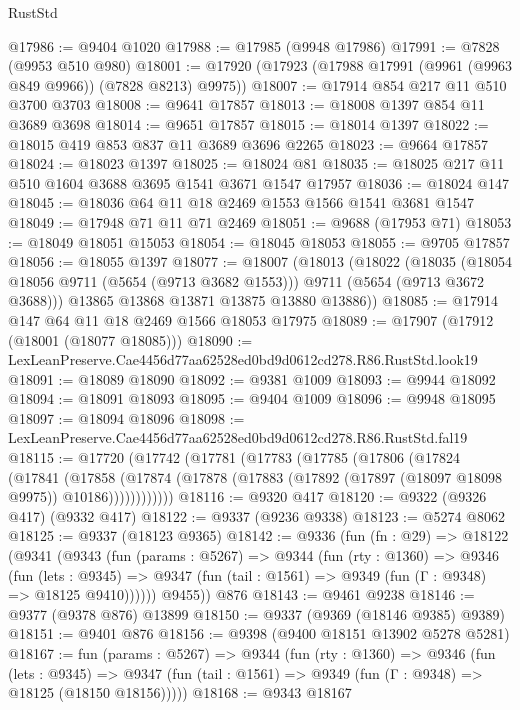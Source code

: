 \begin{lexlean}{RustStd}
\begin{coremodule}
@17986 := @9404 @1020
@17988 := @17985 (@9948 @17986)
@17991 := @7828 (@9953 @510 @980)
@18001 := @17920 (@17923 (@17988 @17991 (@9961 (@9963 @849 @9966)) (@7828 @8213) @9975))
@18007 := @17914 @854 @217 @11 @510 @3700 @3703
@18008 := @9641 @17857
@18013 := @18008 @1397 @854 @11 @3689 @3698
@18014 := @9651 @17857
@18015 := @18014 @1397
@18022 := @18015 @419 @853 @837 @11 @3689 @3696 @2265
@18023 := @9664 @17857
@18024 := @18023 @1397
@18025 := @18024 @81
@18035 := @18025 @217 @11 @510 @1604 @3688 @3695 @1541 @3671 @1547 @17957
@18036 := @18024 @147
@18045 := @18036 @64 @11 @18 @2469 @1553 @1566 @1541 @3681 @1547
@18049 := @17948 @71 @11 @71 @2469
@18051 := @9688 (@17953 @71)
@18053 := @18049 @18051 @15053
@18054 := @18045 @18053
@18055 := @9705 @17857
@18056 := @18055 @1397
@18077 := @18007
    (@18013
      (@18022
        (@18035 (@18054 @18056 @9711 (@5654 (@9713 @3682 @1553))) @9711 (@5654 (@9713 @3672 @3688)))
        @13865
        @13868
        @13871
        @13875
        @13880
        @13886))
@18085 := @17914 @147 @64 @11 @18 @2469 @1566 @18053 @17975
@18089 := @17907 (@17912 (@18001 (@18077 @18085)))
@18090 := LexLeanPreserve.Cae4456d77aa62528ed0bd9d0612cd278.R86.RustStd.look19
@18091 := @18089 @18090
@18092 := @9381 @1009
@18093 := @9944 @18092
@18094 := @18091 @18093
@18095 := @9404 @1009
@18096 := @9948 @18095
@18097 := @18094 @18096
@18098 := LexLeanPreserve.Cae4456d77aa62528ed0bd9d0612cd278.R86.RustStd.fal19
@18115 := @17720
    (@17742
      (@17781
        (@17783
          (@17785
            (@17806
              (@17824
                (@17841
                  (@17858
                    (@17874
                      (@17878 (@17883 (@17892 (@17897 (@18097 @18098 @9975)) @10186))))))))))))
@18116 := @9320 @417
@18120 := @9322 (@9326 @417) (@9332 @417)
@18122 := @9337 (@9236 @9338)
@18123 := @5274 @8062
@18125 := @9337 (@18123 @9365)
@18142 := @9336
    (fun (fn : @29) =>
    @18122
      (@9341
        (@9343
          (fun (params : @5267) =>
          @9344
            (fun (rty : @1360) =>
            @9346
              (fun (lets : @9345) =>
              @9347 (fun (tail : @1561) => @9349 (fun (Γ : @9348) => @18125 @9410))))))
        @9455))
    @876
@18143 := @9461 @9238
@18146 := @9377 (@9378 @876) @13899
@18150 := @9337 (@9369 (@18146 @9385) @9389)
@18151 := @9401 @876
@18156 := @9398 (@9400 @18151 @13902 @5278 @5281)
@18167 := fun (params : @5267) =>
  @9344
    (fun (rty : @1360) =>
    @9346
      (fun (lets : @9345) =>
      @9347 (fun (tail : @1561) => @9349 (fun (Γ : @9348) => @18125 (@18150 @18156)))))
@18168 := @9343 @18167

\end{coremodule}
\end{lexlean}

